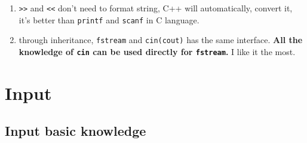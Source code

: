 \documentclass[a4paper,11pt,twoside]{book}
\begin{document}
\begin{itemize}
\begin{enumerate}
		\item \verb=>>= and \verb=<<= don't need to format string,  C++ will automatically,  convert it, it's better than \texttt{printf} and \texttt{scanf} in C language.
		
		\item through inheritance, \texttt{fstream} and \texttt{cin(cout)} has the same interface. \textbf{All the knowledge of \texttt{cin} can be used directly for \texttt{fstream}.} I like it the most.
	\end{enumerate}
	
\end{itemize}



\section{Input}

\subsection{Input basic knowledge}
\end{document}
